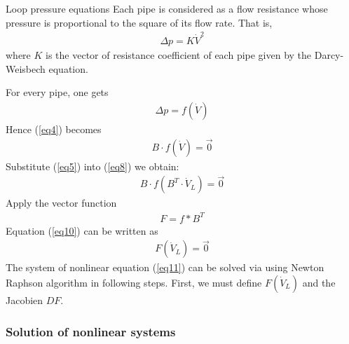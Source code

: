 \documentclass[xcolor=dvipsnames]{beamer}
\newcommand{\dV}{\dot{V}}
\begin{document}
\begin{frame}[fragile,shrink=30]{Loop pressure equations}
	Each pipe is considered as a flow resistance whose pressure is proportional to the square of its flow rate. That is,
	\begin{align}\label{eq6}
		\Delta p = K \dV^2
	\end{align}
where $K$ is the vector of resistance coefficient of each pipe given by the Darcy-Weisbech equation.

For every pipe, one gets
\begin{align}\label{eq7}
	\Delta p = f(\dV)
\end{align}
Hence (\ref{eq4}) becomes
\begin{align}\label{eq8}
	B\cdot f(\dV)=\vec{0}
\end{align}
Substitute (\ref{eq5}) into (\ref{eq8}) we obtain:
\begin{align}
	B\cdot f(B^T\cdot \dV_L)=\vec{0}
\end{align}
Apply the vector function
\begin{align}\label{eq10}
	F=f*B^T
\end{align}
Equation (\ref{eq10}) can be written as
\begin{align}\label{eq11}
	F(\dV_L)=\vec{0}
\end{align}
The system of nonlinear equation (\ref{eq11}) can be solved via using Newton Raphson algorithm in following steps. 
First, we must define $F(\dV_L)$ and the Jacobien $DF$.
\end{frame}

\subsubsection{Solution of nonlinear systems}
\end{document}
